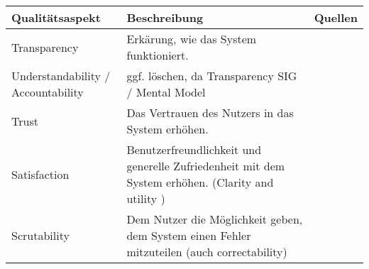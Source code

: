 \begin{longtable}{|p{}|p{}|p{}|}
    \hline
    \textbf{Qualitätsaspekt}     & \textbf{Beschreibung} & \textbf{Quellen} \\ \hline
    Transparency      & Erkärung, wie das System funktioniert. & \cite{nunes_systematic_2017} \cite{chazette_knowledge_nodate} \cite{tintarev_designing_nodate} \cite{chazette_end-users_nodate} \cite{balog_measuring_2020} \cite{chazette2020explainability} \cite{tintarev2015explaining} \cite{hernandez-bocanegra_effects_2020} \cite{tsai_effects_2020} \cite{rjoob_towards_2021}  \cite{sokol_one_2020} \cite{wang_is_2018} \cite{koo_understanding_2016} \cite{tintarev2007survey}\\ \hline
    Understandability / Accountability & ggf. löschen, da Transparency SIG / Mental Model & \cite{chazette_knowledge_nodate} \cite{chazette_end-users_nodate} \cite{martin_evaluating_2021}  \cite{ehsan_human-centered_2020} \cite{rjoob_towards_2021}  \cite{sokol_one_2020} \cite{cheng2019explaining} \\ \hline
    Trust      & Das Vertrauen des Nutzers in das System erhöhen. & \cite{nunes_systematic_2017} \cite{chazette_knowledge_nodate} \cite{tintarev_designing_nodate} \cite{balog_measuring_2020} \cite{eiband_impact_2019} \cite{tintarev2015explaining} \cite{hernandez-bocanegra_effects_2020} \cite{stange_effects_2021} \cite{weitz_you_2019} \cite{yamada_evaluating_2016} \cite{haspiel_explanations_2018} \cite{martin_developing_2019} \cite{martin_evaluating_2021} \cite{tsai_effects_2020}  \cite{sokol_one_2020}  \cite{wang_is_2018} \cite{koo_understanding_2016} \cite{wiegand2019drive} \cite{gunning2019darpa} \cite{lim_2009_assessing} \cite{tintarev2007survey} \\ \hline
    Satisfaction      & Benutzerfreundlichkeit und generelle Zufriedenheit mit dem System erhöhen. (Clarity and utility \cite{martin_evaluating_2021}) & \cite{nunes_systematic_2017} \cite{chazette_knowledge_nodate} \cite{tintarev_designing_nodate} \cite{balog_measuring_2020} \cite{tsai_evaluating_2019} \cite{tintarev2015explaining} \cite{riveiro_thats_2021} \cite{martin_developing_2019} \cite{martin_evaluating_2021} \cite{tsai_effects_2020} \cite{ehsan_human-centered_2020} \cite{sovrano_modelling_2020} \cite{koo_understanding_2016} \cite{ribera2019can} \cite{gunning2019darpa} \cite{lim_2009_assessing}  \cite{tintarev2007survey}\\ \hline
    Scrutability      & Dem Nutzer die Möglichkeit geben, dem System einen Fehler mitzuteilen (auch correctability) \cite{martin_evaluating_2021}  & \cite{nunes_systematic_2017} \cite{chazette_knowledge_nodate} \cite{tintarev_designing_nodate} \cite{balog_measuring_2020} \cite{tintarev2015explaining} \cite{martin_developing_2019} \cite{gunning2019darpa}  \cite{tintarev2007survey}\\ \hline

\end{longtable}

